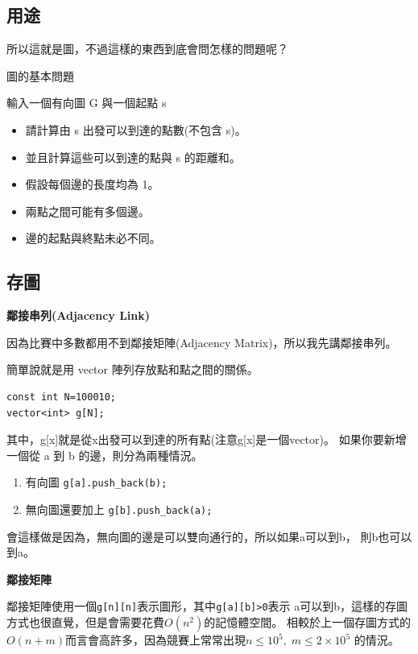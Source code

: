     \subsection{用途}

    所以這就是圖，不過這樣的東西到底會問怎樣的問題呢？

    \example 圖的基本問題
    
    輸入一個有向圖 G 與一個起點 s

    \begin{itemize}
        \item 請計算由 s 出發可以到達的點數(不包含 s)。
        \item 並且計算這些可以到達的點與 s 的距離和。
        \item 假設每個邊的長度均為 1。
        \item 兩點之間可能有多個邊。
        \item 邊的起點與終點未必不同。
    \end{itemize}

    \subsection{存圖}
    \textbf{鄰接串列(Adjacency Link)}

    因為比賽中多數都用不到鄰接矩陣(Adjacency Matrix)，所以我先講鄰接串列。

    簡單說就是用 vector 陣列存放點和點之間的關係。

\begin{lstlisting}[caption=存圖]
const int N=100010;
vector<int> g[N];
\end{lstlisting}

    其中，g[x]就是從x出發可以到達的所有點(注意g[x]是一個vector)。
    如果你要新增一個從 a 到 b 的邊，則分為兩種情況。

    \begin{enumerate}
        \item 有向圖 \verb|g[a].push_back(b);|
        \item 無向圖還要加上 \verb|g[b].push_back(a);|
    \end{enumerate}

    會這樣做是因為，無向圖的邊是可以雙向通行的，所以如果a可以到b，
    則b也可以到a。

    \textbf{鄰接矩陣}

    鄰接矩陣使用一個\verb|g[n][n]|表示圖形，其中\verb|g[a][b]>0|表示
    a可以到b，這樣的存圖方式也很直覺，但是會需要花費$O(n^2)$的記憶體空間。
    相較於上一個存圖方式的$O(n+m)$而言會高許多，因為競賽上常常出現$n \le 10^5, \; m \le 2 \times 10^5$
    的情況。

